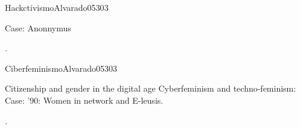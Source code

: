 \begin{syllabus}
\begin{unit}{Hackctivismo}{}{Alvarado05}{30}{3}
   \begin{topics}
      \item Case: Anonnymus
   \end{topics}

   \begin{learningoutcomes}
      \item .
   \end{learningoutcomes}
\end{unit}

\begin{unit}{Ciberfeminismo}{}{Alvarado05}{30}{3}
   \begin{topics}
      \item Citizenship and gender in the digital age Cyberfeminism and techno-feminism: Case: '90: Women in network and E-leusis.
   \end{topics}

   \begin{learningoutcomes}
      \item .
   \end{learningoutcomes}
\end{unit}


\begin{coursebibliography}
\end{coursebibliography}

\end{syllabus}
